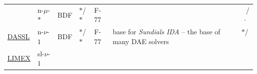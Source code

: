 \documentclass[]{book}
\theoremstyle{definition}
\theoremstyle{definition}
\theoremstyle{definition}
\theoremstyle{definition}
\theoremstyle{remark}
\begin{document}
\begin{longtable}[]{@{}llllllc@{}}
\begin{minipage}[t]{0.06\columnwidth}
\end{minipage} & \begin{minipage}[t]{0.06\columnwidth}\raggedright
n-\(\mu\)-\(*\)\strut
\end{minipage} & \begin{minipage}[t]{0.10\columnwidth}\raggedright
BDF\strut
\end{minipage} & \begin{minipage}[t]{0.05\columnwidth}\raggedright
\(*\)/\(*\)\strut
\end{minipage} & \begin{minipage}[t]{0.06\columnwidth}\raggedright
F-77\strut
\end{minipage} & \begin{minipage}[t]{0.41\columnwidth}\raggedright
\strut
\end{minipage} & \begin{minipage}[t]{0.05\columnwidth}\centering
\(\phantom{*}\)/\(\cdot\)\strut
\end{minipage}\tabularnewline
\begin{minipage}[t]{0.06\columnwidth}\raggedright
\href{http://www.netlib.org/ode/ddassl.f}{DASSL}\strut
\end{minipage} & \begin{minipage}[t]{0.06\columnwidth}\raggedright
n-\(\nu\)-\(1\)\strut
\end{minipage} & \begin{minipage}[t]{0.10\columnwidth}\raggedright
BDF\strut
\end{minipage} & \begin{minipage}[t]{0.05\columnwidth}\raggedright
\(*\)/\(*\)\strut
\end{minipage} & \begin{minipage}[t]{0.06\columnwidth}\raggedright
F-77\strut
\end{minipage} & \begin{minipage}[t]{0.41\columnwidth}\raggedright
base for \emph{Sundials IDA} -- the base of many DAE solvers\strut
\end{minipage} & \begin{minipage}[t]{0.05\columnwidth}\centering
\(*\)/\(\phantom{\cdot}\)\strut
\end{minipage}\tabularnewline
\begin{minipage}[t]{0.06\columnwidth}\raggedright
\href{https://doi.org/10.1007/BF01400352}{LIMEX}\strut
\end{minipage} & \begin{minipage}[t]{0.06\columnwidth}\raggedright
sl-\(\nu\)-\(1\)\strut

\end{minipage}
\end{longtable}
\end{document}
